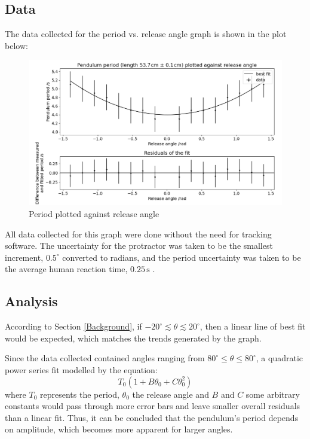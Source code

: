 \documentclass[12pt]{article}
\begin{document}
\newpage

\subsection{Data}
The data collected for the period vs. release angle graph is shown in the plot below:

\begin{figure}[!hptb]
    \centering
    \includegraphics[width=\textwidth]{../figures/period_vs_release_angle.png}
    \caption{\centering Period plotted against release angle}
    \label{fig:figure 2}
\end{figure}

All data collected for this graph were done without the need for tracking software. The uncertainty for the protractor was taken to be the smallest increment, $0.5^{\circ}$ converted to radians, and the period uncertainty was taken to be the average human reaction time, $0.25\,\text{s}$ \cite{reaction-time}.

\subsection{Analysis}
According to Section \ref{Background}, if $-20^{\circ} \lesssim \theta \lesssim 20^{\circ}$, then a linear line of best fit would be expected, which matches the trends generated by the graph.

Since the data collected contained angles ranging from $ 80^{\circ} \leq \theta \leq 80^{\circ}$, a quadratic power series fit modelled by the equation:
\begin{equation}
    T_0(1 + B\theta_0 + C\theta_0^2)
\end{equation}
where $T_0$ represents the period, $\theta_0$ the release angle and $B$ and $C$ some arbitrary constants would pass through more error bars and leave smaller overall residuals than a linear fit. Thus, it can be concluded that the pendulum's period depends on amplitude, which becomes more apparent for larger angles.
\end{document}
